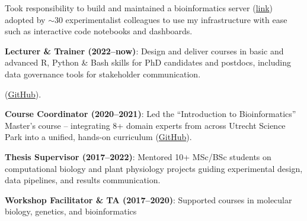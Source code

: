 \documentclass[a4paper,10pt]{article}
\begin{document}
{\begin{adjustbox}{valign=t}
\begin{minipage}[t]{0.6\textwidth}
\begin{description}
  \item Took responsibility to build and maintained a bioinformatics server 
    (\href{https://lauralwd.github.io/blog/post-mpp-server/}{link}) 
    adopted by $\sim$30 experimentalist colleagues to use my infrastructure with ease such as interactive code notebooks and dashboards.
\end{description}

\end{minipage}%
\end{adjustbox}%
}
\newpage

\begin{description}
  \raggedright
  \item \textbf{Lecturer \& Trainer (2022–now)}: Design and deliver courses in 
    basic and advanced R, Python \& Bash skills for PhD candidates and postdocs, 
    including data governance tools for stakeholder communication.

    (\href{https://github.com/lauralwd/professional_education}{GitHub}).
  \item \textbf{Course Coordinator (2020–2021)}: Led the “Introduction to Bioinformatics” Master’s course 
    -- integrating 8+ domain experts 
    from across Utrecht Science Park into a unified, hands-on curriculum 
    (\href{https://lauralwd.github.io/metagenomicspractical/}{GitHub}).
  \item \textbf{Thesis Supervisor (2017–2022)}: Mentored 10+ MSc/BSc students on computational biology and 
    plant physiology projects guiding experimental design, data pipelines, and results communication.
  \item \textbf{Workshop Facilitator \& TA (2017–2020)}: Supported courses in molecular biology, genetics, and bioinformatics
\end{description}
\end{document}
